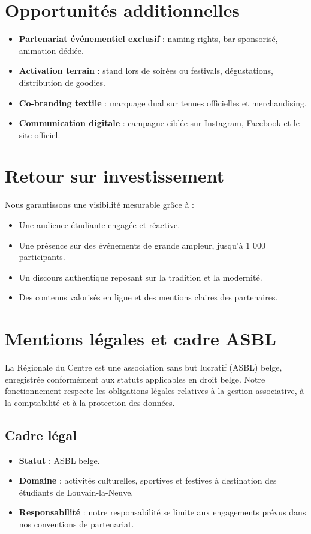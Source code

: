 \documentclass[11pt,a4paper]{scrartcl}
\begin{document}
\section{Opportunités additionnelles}
\begin{itemize}[leftmargin=*]
    \item \textbf{Partenariat événementiel exclusif} : naming rights, bar sponsorisé, animation dédiée.
    \item \textbf{Activation terrain} : stand lors de soirées ou festivals, dégustations, distribution de goodies.
    \item \textbf{Co-branding textile} : marquage dual sur tenues officielles et merchandising.
    \item \textbf{Communication digitale} : campagne ciblée sur Instagram, Facebook et le site officiel.
\end{itemize}

\section{Retour sur investissement}
Nous garantissons une visibilité mesurable grâce à :
\begin{itemize}[leftmargin=*]
    \item Une audience étudiante engagée et réactive.
    \item Une présence sur des événements de grande ampleur, jusqu'à 1 000 participants.
    \item Un discours authentique reposant sur la tradition et la modernité.
    \item Des contenus valorisés en ligne et des mentions claires des partenaires.
\end{itemize}

\section{Mentions légales et cadre ASBL}
La Régionale du Centre est une association sans but lucratif (ASBL) belge, enregistrée conformément aux statuts applicables en droit belge. Notre fonctionnement respecte les obligations légales relatives à la gestion associative, à la comptabilité et à la protection des données.

\subsection{Cadre légal}
\begin{itemize}[leftmargin=*]
    \item \textbf{Statut} : ASBL belge.
    \item \textbf{Domaine} : activités culturelles, sportives et festives à destination des étudiants de Louvain-la-Neuve.
    \item \textbf{Responsabilité} : notre responsabilité se limite aux engagements prévus dans nos conventions de partenariat.
\end{itemize}
\end{document}
